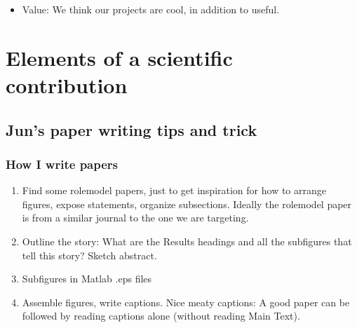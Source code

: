 \documentclass[letterpaper,10pt,english]{sphinxmanual}
\begin{document}
\begin{itemize}
\begin{description}
\begin{itemize}
\end{itemize}

\end{description}

\item {} 
\sphinxAtStartPar
Value: We think our projects are cool, in addition to useful.
\sphinxhyphen{} 

\end{itemize}

\sphinxstepscope


\chapter{Elements of a scientific contribution}
\label{\detokenize{02Elements:elements-of-a-scientific-contribution}}\label{\detokenize{02Elements::doc}}
\sphinxstepscope


\section{Jun’s paper writing tips and trick}
\label{\detokenize{PaperWritingTips:jun-s-paper-writing-tips-and-trick}}\label{\detokenize{PaperWritingTips:paperwritingtips}}\label{\detokenize{PaperWritingTips::doc}}

\subsection{How I write papers}
\label{\detokenize{PaperWritingTips:how-i-write-papers}}\begin{enumerate}
%
\setcounter{enumi}{-1}
\item {} 
\sphinxAtStartPar
Find some role\sphinxhyphen{}model papers, just to get inspiration for how to arrange figures, expose statements, organize subsections. Ideally the role\sphinxhyphen{}model paper is from a similar journal to the one we are targeting.

\item {} 
\sphinxAtStartPar
Outline the story: What are the Results headings and all the subfigures that tell this story? Sketch abstract.

\item {} 
\sphinxAtStartPar
Subfigures in Matlab .eps files

\item {} 
\sphinxAtStartPar
Assemble figures, write captions. Nice meaty captions: A good paper can be followed by reading captions alone (without reading Main Text).

\end{enumerate}
\end{document}
